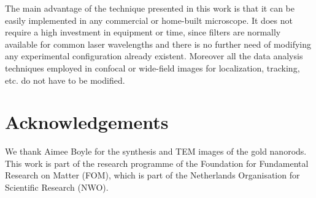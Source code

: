 \documentclass[journal=nalefd,manuscript=letter]{achemso}
\begin{document}
The main advantage of the technique presented in this work is that it can be
easily implemented in any commercial or home-built microscope. It does not
require a high investment in equipment or time, since filters are normally
available for common laser wavelengths and there is no further need of modifying
any experimental configuration already existent. Moreover all the data analysis
techniques employed in confocal or wide-field images for localization, tracking,
etc. do not have to be modified.

\section{Acknowledgements}
We thank Aimee Boyle for the synthesis and TEM images of the gold nanorods.
This work is part of the research programme of the Foundation for Fundamental
Research on Matter (FOM), which is part of the Netherlands Organisation for
Scientific Research (NWO).


\end{document}
